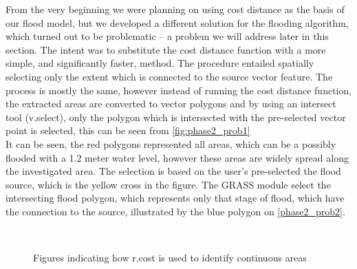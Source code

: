 From the very beginning we were planning on using cost distance as the basis of our flood model, but we developed a different solution for the flooding algorithm, which turned out to be problematic – a problem we will address later in this section. The intent was to substitute the cost distance function with a more simple, and significantly faster, method. The procedure entailed spatially selecting only the extent which is connected to the source vector feature. The process is mostly the same, however instead of running the cost distance function, the extracted areas are converted to vector polygons and by using an intersect tool (v.select), only the polygon which is intersected with the pre-selected vector point is selected, this can be seen from \autoref{fig:phase2_prob1}\\
It can be seen, the red polygons represented all areas, which can be a possibly flooded with a 1.2 meter water level, however these areas are widely spread along the investigated area. The selection is  based on the user's pre-selected the flood source, which is the yellow cross in the figure. The GRASS module select the intersecting flood polygon, which represents only that stage of flood, which have the connection to the source, illustrated by the blue polygon on \autoref{phase2_prob2}. 

\begin{figure}[h!]
  \myfloatalign
   \quad
   \\
 \caption{Figures indicating how r.cost is used to identify continuous areas}
 \label{fig:phase2_prob12}
\end{figure}

